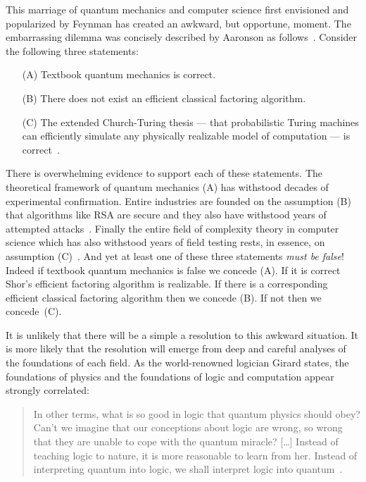 \documentclass{article}
\theoremstyle{remark}
\begin{document}
\noindent This marriage of quantum mechanics and computer science first
envisioned and popularized by Feynman has created an awkward, but
opportune, moment. The embarrassing dilemma was concisely described by
Aaronson as follows~\cite{AaronsonArkhipov2011,BFRDARW2013}.  Consider
the following three statements:
\begin{enumerate}
\item[(A)] Textbook quantum mechanics is correct.
\item[(B)] There does not exist an efficient classical factoring
  algorithm.
\item[(C)] The extended Church-Turing thesis --- that probabilistic
  Turing machines can efficiently simulate any physically realizable
  model of computation --- is
  correct~\cite{BernsteinVazirani1997,Kaye2007}.
\end{enumerate}
There is overwhelming evidence to support each of these
statements. The theoretical framework of quantum mechanics (A) has
withstood decades of experimental confirmation. Entire industries are
founded on the assumption (B) that algorithms like RSA are secure and
they also have withstood years of attempted
attacks~\cite{boneh1999twenty,wiki:RSAFactoring}. Finally the entire
field of complexity theory in computer science which has also
withstood years of field testing rests, in essence, on assumption
(C)~\cite{Aaronson2005,Piccinini2015}.  And yet at least one of these
three statements \emph{must be false}! Indeed if textbook quantum
mechanics is false we concede (A). If it is correct Shor's efficient
factoring algorithm is realizable. If there is a corresponding
efficient classical factoring algorithm then we concede (B). If not
then we concede~(C).

It is unlikely that there will be a simple a resolution to this
awkward situation. It is more likely that the resolution will emerge
from deep and careful analyses of the foundations of each field. As
the world-renowned logician Girard states, the foundations of physics
and the foundations of logic and computation appear strongly
correlated:
\begin{quote}
  In other terms, what is so good in logic that quantum physics should
  obey? Can't we imagine that our conceptions about logic are wrong,
  so wrong that they are unable to cope with the quantum miracle?
  [\ldots] Instead of teaching logic to nature, it is more reasonable
  to learn from her. Instead of interpreting quantum into logic, we
  shall interpret logic into quantum~\cite{MSC:1444836}.
\end{quote}
\end{document}
